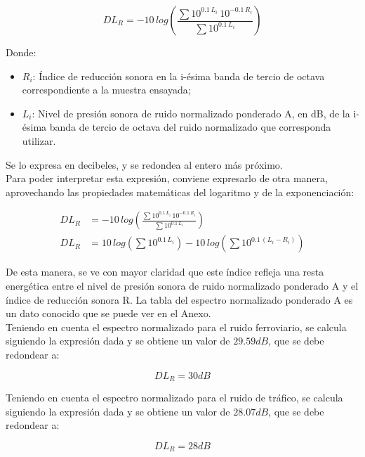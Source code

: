 		\begin{equation}
			DL_R = -10\,log\left(\frac{\sum 10^{0.1\,L_i}\,10^{-0.1\,R_i}}{\sum 10^{0.1\,L_i}}\right)
		\end{equation}
	
		Donde:
		\begin{itemize}
			\item $R_i$: Índice de reducción sonora en la i-ésima banda de tercio de octava correspondiente a la muestra ensayada;
			\item $L_i$: Nivel de presión sonora de ruido normalizado ponderado A, en dB, de la i-ésima banda de tercio de octava del ruido normalizado que corresponda utilizar.
		\end{itemize}
		
		Se lo expresa en decibeles, y se redondea al entero más próximo.\\
		
		Para poder interpretar esta expresión, conviene expresarlo de otra manera, aprovechando las propiedades matemáticas del logaritmo y de la exponenciación:
		
		\begin{align}
			DL_R &= -10\,log\left(\frac{\sum 10^{0.1\,L_i}\,10^{-0.1\,R_i}}{\sum 10^{0.1\,L_i}}\right)\\
			DL_R &= 10\,log\left(\sum 10^{0.1\,L_i}\right) - 10\,log\left(\sum 10^{0.1\,(L_i - R_i)}\right)
		\end{align}
		
		De esta manera, se ve con mayor claridad que este índice refleja una resta energética entre el nivel de presión sonora de ruido normalizado ponderado A y el índice de reducción sonora R. La tabla del espectro normalizado ponderado A es un dato conocido que se puede ver en el Anexo.\\
		
		Teniendo en cuenta el espectro normalizado para el ruido ferroviario, se calcula siguiendo la expresión dada y se obtiene un valor de \texttt{$29.59 dB$}, que se debe redondear a:
		
		\begin{equation*}
			\boxed{DL_R = 30 dB}
		\end{equation*}
		
		Teniendo en cuenta el espectro normalizado para el ruido de tráfico, se calcula siguiendo la expresión dada y se obtiene un valor de \texttt{$28.07 dB$}, que se debe redondear a:
		
		\begin{equation*}
			\boxed{DL_R = 28 dB}
		\end{equation*}
	
